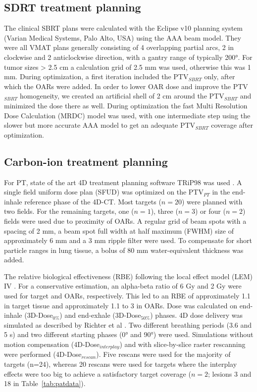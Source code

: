 \subsection{SDRT treatment planning}
\label{SBRTTP}

The clinical SBRT plans were calculated with the Eclipse v10 planning system (Varian Medical Systems, Palo Alto, USA) using the AAA beam model. They were all VMAT plans generally consisting of 4 overlapping partial arcs, 2 in clockwise and 2 anticlockwise direction, with a gantry range of typically 200°. For tumor sizes > 2.5 cm a calculation grid of 2.5 mm was used, otherwise this was 1 mm. During optimization, a first iteration included the PTV$_{SBRT}$ only, after which the OARs were added. In order to lower OAR dose and improve the PTV$_{SBRT}$ homogeneity, we created an artificial shell of 2 cm around the PTV$_{SBRT}$ and minimized the dose there as well. During optimization the fast Multi Resolution Dose Calculation (MRDC) model was used, with one intermediate step using the slower but more accurate AAA model to get an adequate PTV$_{SBRT}$ coverage after optimization.


\subsection{Carbon-ion treatment planning}
\label{PTTP}

For PT, state of the art 4D treatment planning software TRiP98 was used \cite{Richter2013}. A single field uniform dose plan (SFUD) 
was optimized on the PTV$_{PT}$ in the end-inhale reference phase of the 4D-CT. Most targets ($n=20$) were planned with two fields. 
For the remaining targets, one ($n=1$), three ($n=3$) or four ($n=2$) fields were used due to proximity of OARs. 
A regular grid of beam spots with a spacing of 2 mm, a beam spot full width at half maximum (FWHM) size of approximately 6 mm and a 
3 mm ripple filter were used. To compensate for short particle ranges in lung tissue, a bolus of 80 mm water-equivalent thickness 
was added.

The relative biological effectiveness (RBE) following the local effect model (LEM) IV \cite{Elsaesser2010}. 
For a conservative estimation, an alpha-beta ratio of 6 Gy and 2 Gy were used for target and OARs, respectively. 
This led to an RBE of approximately 1.1 in target tissue and approximately 1.1 to 3 in OARs.
Dose was calculated on end-inhale (3D-Dose$_{0\%}$) and end-exhale (3D-Dose$_{50\%}$) phases. 
4D dose delivery was simulated as described by Richter et al \cite{Richter2014}. Two different breathing periods (3.6 and 5 s) 
and two different starting phases (0° and 90°) were used. Simulations without motion compensation (4D-Dose$_{interplay}$)
and with slice-by-slice raster rescanning were performed (4D-Dose$_{rescan}$). Five rescans were used for the majority 
of targets (n=24), whereas 20 rescans were used for targets where the interplay effects were too big to achieve a 
satisfactory target coverage ($n=2$; lesions 3 and 18 in Table~\ref{tab:patdata}). 


